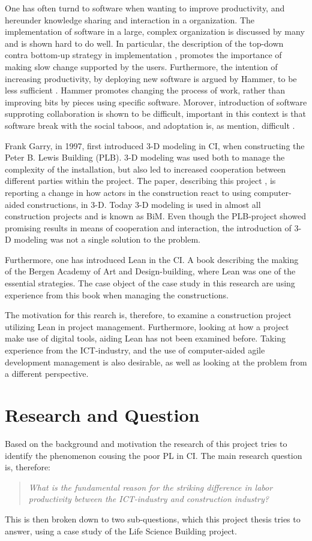 One has often turnd to software when wanting to improve productivity, and hereunder knowledge sharing and interaction in a organization. The implementation of software in a large, complex organization is discussed by many and is shown hard to do well. In particular, the description of the top-down contra bottom-up strategy in implementation \cite{Robey&Sahay}, promotes the importance of making slow change supported by the users. Furthermore, the intention of increasing productivity, by deploying new software is argued by Hammer, to be less sufficient \cite{hammer1990reengineering}. Hammer promotes changing the process of work, rather than improving bits by pieces using specific software. Morover, introduction of software supproting collaboration is shown to be difficult, important in this context is that software break with the social taboos, and adoptation is, as mention, difficult \cite{Grudin}. 

Frank Garry, in 1997, first introduced 3-D modeling in CI, when constructing the Peter B. Lewis Building (PLB). 3-D modeling was used both to manage the complexity of the installation, but also led to increased cooperation between different parties within the project. The paper, describing this project \cite{frank_gehry}, is reporting a change in how actors in the construction react to using computer-aided constructions, in 3-D. Today 3-D modeling is used in almost all construction projects and is known as BiM. Even though the PLB-project showed promising results in means of cooperation and interaction, the introduction of 3-D modeling was not a single solution to the problem.

Furthermore, one has introduced Lean in the CI. A book \cite{lean_i_praksis} describing the making of the Bergen Academy of Art and Design-building, where Lean was one of the essential strategies. The case object of the case study in this research are using experience from this book when managing the constructions. 

The motivation for this rearch is, therefore, to examine a construction project utilizing Lean in project management. Furthermore, looking at how a project make use of digital tools, aiding Lean has not been examined before. Taking experience from the ICT-industry, and the use of computer-aided agile development management is also desirable, as well as looking at the problem from a different perspective.

\section{Research and Question} \label{sec:research}
Based on the background and motivation the research of this project tries to identify the phenomenon cousing the poor PL in CI. The main research question is, therefore:
\begin{quote}
    \textit{What is the fundamental reason for the striking difference in labor productivity between the ICT-industry and construction industry?} 
\end{quote}
This is then broken down to two sub-questions, which this project thesis tries to answer, using a case study of the Life Science Building project.


